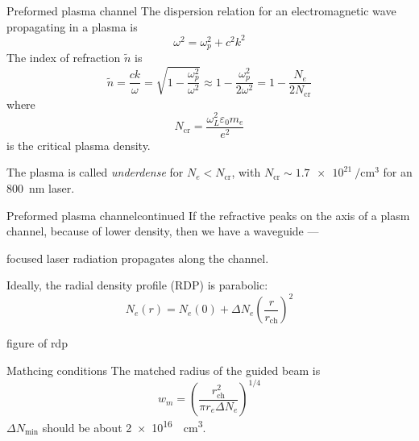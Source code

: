 \documentclass[final]{beamer}
\begin{document}
  \begin{frame}{Preformed plasma channel}
  The dispersion relation for an electromagnetic wave propagating in a plasma is
  \begin{equation}
    \omega^2=\omega_p^2+c^2k^2
  \end{equation}
  The index of refraction $\tilde n$ is
  \begin{equation}
    \tilde{n}=\frac{c k}{\omega}=\sqrt{1-\frac{\omega_p^2}{\omega^2}}\approx1-\frac{\omega_p^2}{2\omega^2}=1-\frac{N_e}{2N_\text{cr}}
  \end{equation}
  where
    \begin{equation}
        N_\text{cr}=\frac{\omega_L^2\varepsilon_0 m_e}{e^2}
    \end{equation}
    is the critical plasma density.

    The plasma is called \textit{underdense} for $N_e < N_\text{cr}$, with $N_\text{cr}\sim\SI{1.7e21}{\per\cubic\cm}$ for an \SI{800}{\nm} laser.
\end{frame}
  \begin{frame}{Preformed plasma channel}{continued}
    If the refractive peaks on the axis of a plasm channel, because of lower density, then we have a waveguide ---

    focused laser radiation propagates along the channel.

    Ideally, the radial density profile (RDP) is parabolic:
     \begin{equation*}
      N_e(r)=N_e(0)+\Delta N_e\left( \frac{r}{r_\text{ch}}\right)^2
    \end{equation*}
    \begin{center}
      figure of rdp
    \end{center}
  \end{frame}
  \begin{frame}{Mathcing conditions}
    The matched radius of the guided beam is \cite{}
   \begin{equation*}
     w_m=\left( \frac{r_\text{ch}^2}{\pi r_e \Delta N_e}\right)^{1/4}
   \end{equation*}
   $\Delta N_\text{min}$ should be about \SI{2e16}{\per \cubic \cm}.
  \end{frame}
\end{document}
